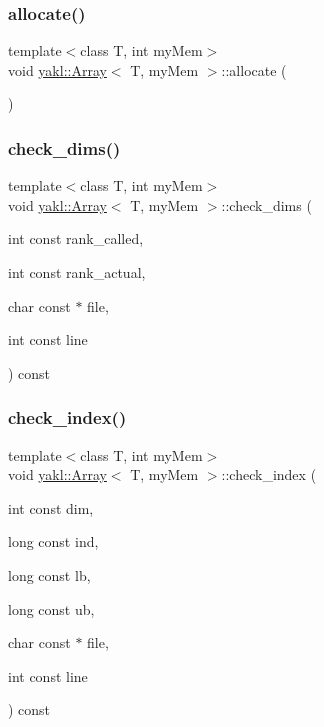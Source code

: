 \subsubsection{\texorpdfstring{allocate()}{allocate()}}
{\footnotesize\ttfamily template$<$class T, int my\+Mem$>$ \\
void \hyperlink{classyakl_1_1Array}{yakl\+::\+Array}$<$ T, my\+Mem $>$\+::allocate (\begin{DoxyParamCaption}{ }\end{DoxyParamCaption})\hspace{0.3cm}{\ttfamily [inline]}}

\mbox{\label{classyakl_1_1Array_ae3887c68b1d1546fcb97a39d66f0dc48}} 
\subsubsection{\texorpdfstring{check\+\_\+dims()}{check\_dims()}}
{\footnotesize\ttfamily template$<$class T, int my\+Mem$>$ \\
void \hyperlink{classyakl_1_1Array}{yakl\+::\+Array}$<$ T, my\+Mem $>$\+::check\+\_\+dims (\begin{DoxyParamCaption}\item[{int const}]{rank\+\_\+called,  }\item[{int const}]{rank\+\_\+actual,  }\item[{char const $\ast$}]{file,  }\item[{int const}]{line }\end{DoxyParamCaption}) const\hspace{0.3cm}{\ttfamily [inline]}}

\mbox{\label{classyakl_1_1Array_a24b13664d65c0c4f9a111c0897bd2f4d}} 
\subsubsection{\texorpdfstring{check\+\_\+index()}{check\_index()}}
{\footnotesize\ttfamily template$<$class T, int my\+Mem$>$ \\
void \hyperlink{classyakl_1_1Array}{yakl\+::\+Array}$<$ T, my\+Mem $>$\+::check\+\_\+index (\begin{DoxyParamCaption}\item[{int const}]{dim,  }\item[{long const}]{ind,  }\item[{long const}]{lb,  }\item[{long const}]{ub,  }\item[{char const $\ast$}]{file,  }\item[{int const}]{line }\end{DoxyParamCaption}) const\hspace{0.3cm}{\ttfamily [inline]}}


